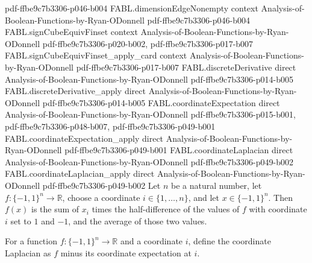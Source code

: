 \begin{theorem}
  {pdf-ffbe9c7b3306-p046-b004}
\proofstep
  {FABL.dimensionEdgeNonempty}
  {context}
  {Analysis-of-Boolean-Functions-by-Ryan-ODonnell}
  {pdf-ffbe9c7b3306-p046-b004}
\proofstep
  {FABL.signCubeEquivFinset}
  {context}
  {Analysis-of-Boolean-Functions-by-Ryan-ODonnell}
  {pdf-ffbe9c7b3306-p020-b002,
    pdf-ffbe9c7b3306-p017-b007}
\proofstep
  {FABL.signCubeEquivFinset_apply_card}
  {context}
  {Analysis-of-Boolean-Functions-by-Ryan-ODonnell}
  {pdf-ffbe9c7b3306-p017-b007}
\proofstep
  {FABL.discreteDerivative}
  {direct}
  {Analysis-of-Boolean-Functions-by-Ryan-ODonnell}
  {pdf-ffbe9c7b3306-p014-b005}
\proofstep
  {FABL.discreteDerivative_apply}
  {direct}
  {Analysis-of-Boolean-Functions-by-Ryan-ODonnell}
  {pdf-ffbe9c7b3306-p014-b005}
\proofstep
  {FABL.coordinateExpectation}
  {direct}
  {Analysis-of-Boolean-Functions-by-Ryan-ODonnell}
  {pdf-ffbe9c7b3306-p015-b001,
    pdf-ffbe9c7b3306-p048-b007,
    pdf-ffbe9c7b3306-p049-b001}
\proofstep
  {FABL.coordinateExpectation_apply}
  {direct}
  {Analysis-of-Boolean-Functions-by-Ryan-ODonnell}
  {pdf-ffbe9c7b3306-p049-b001}
\proofstep
  {FABL.coordinateLaplacian}
  {direct}
  {Analysis-of-Boolean-Functions-by-Ryan-ODonnell}
  {pdf-ffbe9c7b3306-p049-b002}
\proofstep
  {FABL.coordinateLaplacian_apply}
  {direct}
  {Analysis-of-Boolean-Functions-by-Ryan-ODonnell}
  {pdf-ffbe9c7b3306-p049-b002}
Let $n$ be a natural number, let $f:\{-1,1\}^n\to\mathbb R$, choose a coordinate
$i\in\{1,\ldots,n\}$, and let $x\in\{-1,1\}^n$. Then $f(x)$ is the sum of $x_i$ times
the half-difference of the values of $f$ with coordinate $i$ set to $1$ and $-1$, and
the average of those two values.
\end{theorem}

\begin{definition}
\label{FABL.coordinateLaplacian}
\leanok
{}
For a function $f:\{-1,1\}^n\to\mathbb R$ and a coordinate $i$, define the coordinate
Laplacian as $f$ minus its coordinate expectation at $i$.
\end{definition}

